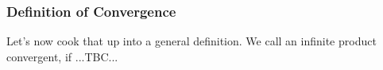 






\subsubsection{Definition of Convergence}
Let's now cook that up into a general definition. We call an infinite product convergent, if ...TBC...


